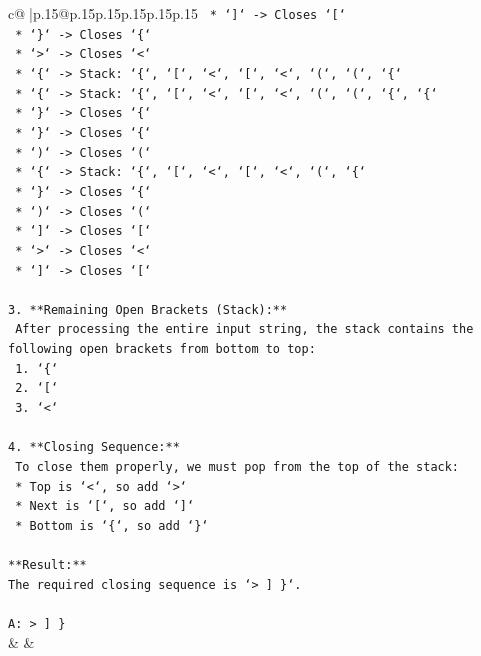 \documentclass{article}
\begin{document}
{\begin{supertabular}{c@{$\;$}|p{.15\linewidth}@{}p{.15\linewidth}p{.15\linewidth}p{.15\linewidth}p{.15\linewidth}p{.15\linewidth}}
{{{\texttt{    *   `{]}` {-}> Closes `{[}`} \\
\texttt{    *   `\}` {-}> Closes `\{`} \\
\texttt{    *   `>` {-}> Closes `<`} \\
\texttt{    *   `\{` {-}> Stack: `\{`, `{[}`, `<`, `{[}`, `<`, `(`, `(`, `\{`} \\
\texttt{    *   `\{` {-}> Stack: `\{`, `{[}`, `<`, `{[}`, `<`, `(`, `(`, `\{`, `\{`} \\
\texttt{    *   `\}` {-}> Closes `\{`} \\
\texttt{    *   `\}` {-}> Closes `\{`} \\
\texttt{    *   `)` {-}> Closes `(`} \\
\texttt{    *   `\{` {-}> Stack: `\{`, `{[}`, `<`, `{[}`, `<`, `(`, `\{`} \\
\texttt{    *   `\}` {-}> Closes `\{`} \\
\texttt{    *   `)` {-}> Closes `(`} \\
\texttt{    *   `{]}` {-}> Closes `{[}`} \\
\texttt{    *   `>` {-}> Closes `<`} \\
\texttt{    *   `{]}` {-}> Closes `{[}`} \\
\\ 
\texttt{3.  **Remaining Open Brackets (Stack):**} \\
\texttt{    After processing the entire input string, the stack contains the following open brackets from bottom to top:} \\
\texttt{    1.  `\{`} \\
\texttt{    2.  `{[}`} \\
\texttt{    3.  `<`} \\
\\ 
\texttt{4.  **Closing Sequence:**} \\
\texttt{    To close them properly, we must pop from the top of the stack:} \\
\texttt{    *   Top is `<`, so add `>`} \\
\texttt{    *   Next is `{[}`, so add `{]}`} \\
\texttt{    *   Bottom is `\{`, so add `\}`} \\
\\ 
\texttt{**Result:**} \\
\texttt{The required closing sequence is `> {]} \}`.} \\
\\ 
\texttt{A: > {]} \}} \\
            }
        }
    }
    & & \\ \\


\end{supertabular}}
\end{document}
